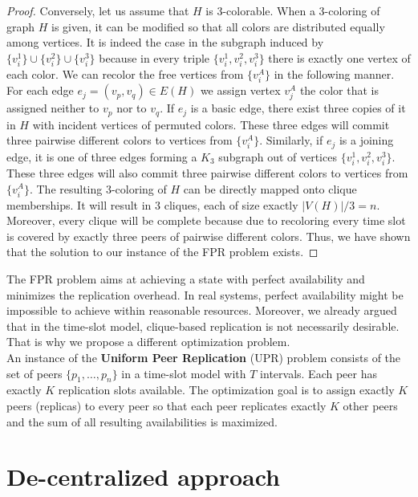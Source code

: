 \documentclass{pracamgren}
\begin{document}
\begin{proof}
Conversely, let us assume that $H$ is 3-colorable. When a 3-coloring of graph $H$ is given, it can be modified so that all colors are distributed equally among vertices. It is indeed the case in the subgraph induced by $\{v^1_i\} \cup \{v^2_i\} \cup \{v^3_i\}$ because in every triple $\{v^1_i, v^2_i, v^3_i\}$ there is exactly one vertex of each color. We can recolor the free vertices from $\{v^A_i\}$ in the following manner. For each edge $e_j=(v_p,v_q)\in E(H)$ we assign vertex $v^A_j$ the color that is assigned neither to $v_p$ nor to $v_q$. If $e_j$ is a basic edge, there exist three copies of it in $H$ with incident vertices of permuted colors. These three edges will commit three pairwise different colors to vertices from $\{v^A_i\}$. Similarly, if $e_j$ is a joining edge, it is one of three edges forming a $K_3$ subgraph out of vertices $\{v^1_i, v^2_i, v^3_i\}$. These three edges will also commit three pairwise different colors to vertices from $\{v^A_i\}$.
The resulting 3-coloring of $H$ can be directly mapped onto clique memberships. It will result in 3 cliques, each of size exactly $|V(H)| / 3 = n$. Moreover, every clique will be complete because due to recoloring every time slot is covered by exactly three peers of pairwise different colors. Thus, we have shown that the solution to our instance of the FPR problem exists.
\end{proof}

The FPR problem aims at achieving a state with perfect availability and minimizes the replication overhead. In real systems, perfect availability might be impossible to achieve within reasonable resources. Moreover, we already argued that in the time-slot model, clique-based replication is not necessarily desirable. That is why we propose a different optimization problem.\\

An instance of the {\bf Uniform Peer Replication} (UPR) problem consists of the set of peers $\{p_1,\ldots,p_n\}$ in a time-slot model with $T$ intervals. Each peer has exactly $K$ replication slots available. The optimization goal is to assign exactly $K$ peers (replicas) to every peer so that each peer replicates exactly $K$ other peers and the sum of all resulting availabilities is maximized.\\

\section{De-centralized approach}\label{sect:decentralized}
\end{document}

